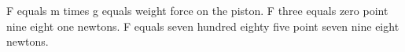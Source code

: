 F equals m times g equals weight force on the piston. F three equals zero point nine eight one newtons. F equals seven hundred eighty five point seven nine eight newtons.